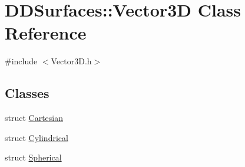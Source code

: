 \hypertarget{class_d_d_surfaces_1_1_vector3_d}{}\section{D\+D\+Surfaces\+:\+:Vector3D Class Reference}
\label{class_d_d_surfaces_1_1_vector3_d}


{\ttfamily \#include $<$Vector3\+D.\+h$>$}

\subsection*{Classes}
\begin{DoxyCompactItemize}
\item 
struct \hyperlink{struct_d_d_surfaces_1_1_vector3_d_1_1_cartesian}{Cartesian}
\item 
struct \hyperlink{struct_d_d_surfaces_1_1_vector3_d_1_1_cylindrical}{Cylindrical}
\item 
struct \hyperlink{struct_d_d_surfaces_1_1_vector3_d_1_1_spherical}{Spherical}
\end{DoxyCompactItemize}
